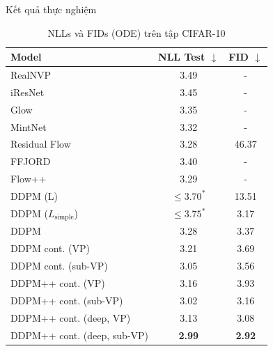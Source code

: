 \documentclass[10pt]{beamer}
\theoremstyle{remark}
\numberwithin{algocf}{section}
\numberwithin{equation}{section}
\numberwithin{dl}{section}
\numberwithin{figure}{section}
\begin{document}
\begin{frame}[shrink]{Kết quả thực nghiệm}
	\begin{table}[H]
		\centering
		\caption{NLLs và FIDs (ODE) trên tập CIFAR-10}
		\begin{tabular}{lcc}
			\hline
			Model & NLL Test $\downarrow$ & FID $\downarrow$ \\
			\hline
			RealNVP \citep{dinh2016density} & 3.49 & - \\
			iResNet \citep{behrmann2019invertible} & 3.45 & - \\
			Glow \citep{kingma2018glow} & 3.35 & - \\
			MintNet \citep{song2019mintnet} & 3.32 & - \\
			Residual Flow \citep{chen2019residual} & 3.28 & 46.37 \\
			FFJORD \citep{grathwohl2018ffjord} & 3.40 & - \\
			Flow++ \citep{ho2019flow++} & 3.29 & - \\
			DDPM (L) \citep{ho2020denoising} & $\leq 3.70^{\ast}$  & 13.51 \\
			DDPM ($L_{\mathrm{simple}}$) \citep{ho2020denoising} & $\leq 3.75^{\ast}$ & 3.17 \\
			\hline
			DDPM & 3.28 & 3.37 \\
			DDPM cont. (VP) & 3.21 & 3.69 \\
			DDPM cont. (sub-VP) & 3.05 & 3.56 \\
			DDPM++ cont. (VP) & 3.16 & 3.93 \\
			DDPM++ cont. (sub-VP) & 3.02 & 3.16 \\
			DDPM++ cont. (deep, VP) & 3.13 & 3.08 \\
			DDPM++ cont. (deep, sub-VP) & \textbf{2.99} & \textbf{2.92} \\
			\hline
		\end{tabular}
		\label{tab:2}
	\end{table}
\end{frame}
\end{document}
